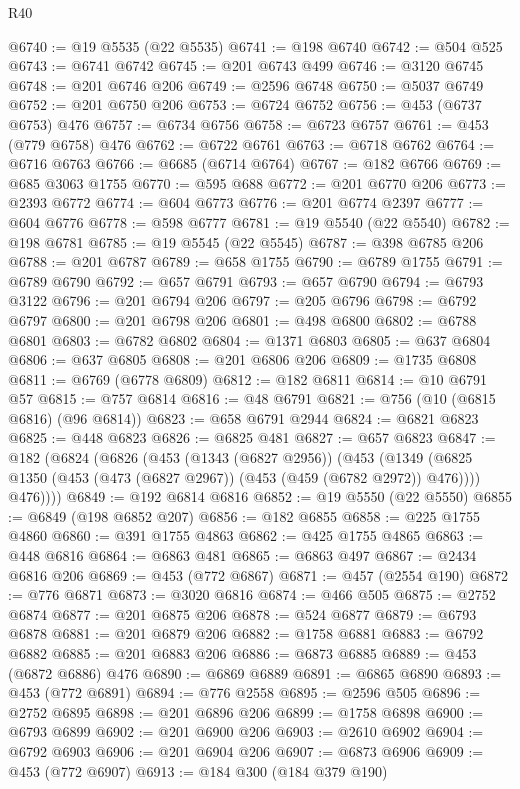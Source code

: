 \begin{lexlean}{R40}
\begin{coremodule}
@6740 := @19 @5535 (@22 @5535)
@6741 := @198 @6740
@6742 := @504 @525
@6743 := @6741 @6742
@6745 := @201 @6743 @499
@6746 := @3120 @6745
@6748 := @201 @6746 @206
@6749 := @2596 @6748
@6750 := @5037 @6749
@6752 := @201 @6750 @206
@6753 := @6724 @6752
@6756 := @453 (@6737 @6753) @476
@6757 := @6734 @6756
@6758 := @6723 @6757
@6761 := @453 (@779 @6758) @476
@6762 := @6722 @6761
@6763 := @6718 @6762
@6764 := @6716 @6763
@6766 := @6685 (@6714 @6764)
@6767 := @182 @6766
@6769 := @685 @3063 @1755
@6770 := @595 @688
@6772 := @201 @6770 @206
@6773 := @2393 @6772
@6774 := @604 @6773
@6776 := @201 @6774 @2397
@6777 := @604 @6776
@6778 := @598 @6777
@6781 := @19 @5540 (@22 @5540)
@6782 := @198 @6781
@6785 := @19 @5545 (@22 @5545)
@6787 := @398 @6785 @206
@6788 := @201 @6787
@6789 := @658 @1755
@6790 := @6789 @1755
@6791 := @6789 @6790
@6792 := @657 @6791
@6793 := @657 @6790
@6794 := @6793 @3122
@6796 := @201 @6794 @206
@6797 := @205 @6796
@6798 := @6792 @6797
@6800 := @201 @6798 @206
@6801 := @498 @6800
@6802 := @6788 @6801
@6803 := @6782 @6802
@6804 := @1371 @6803
@6805 := @637 @6804
@6806 := @637 @6805
@6808 := @201 @6806 @206
@6809 := @1735 @6808
@6811 := @6769 (@6778 @6809)
@6812 := @182 @6811
@6814 := @10 @6791 @57
@6815 := @757 @6814
@6816 := @48 @6791
@6821 := @756 (@10 (@6815 @6816) (@96 @6814))
@6823 := @658 @6791 @2944
@6824 := @6821 @6823
@6825 := @448 @6823
@6826 := @6825 @481
@6827 := @657 @6823
@6847 := @182
    (@6824
      (@6826
        (@453
          (@1343 (@6827 @2956))
          (@453
            (@1349 (@6825 @1350 (@453 (@473 (@6827 @2967)) (@453 (@459 (@6782 @2972)) @476))))
            @476))))
@6849 := @192 @6814 @6816
@6852 := @19 @5550 (@22 @5550)
@6855 := @6849 (@198 @6852 @207)
@6856 := @182 @6855
@6858 := @225 @1755 @4860
@6860 := @391 @1755 @4863
@6862 := @425 @1755 @4865
@6863 := @448 @6816
@6864 := @6863 @481
@6865 := @6863 @497
@6867 := @2434 @6816 @206
@6869 := @453 (@772 @6867)
@6871 := @457 (@2554 @190)
@6872 := @776 @6871
@6873 := @3020 @6816
@6874 := @466 @505
@6875 := @2752 @6874
@6877 := @201 @6875 @206
@6878 := @524 @6877
@6879 := @6793 @6878
@6881 := @201 @6879 @206
@6882 := @1758 @6881
@6883 := @6792 @6882
@6885 := @201 @6883 @206
@6886 := @6873 @6885
@6889 := @453 (@6872 @6886) @476
@6890 := @6869 @6889
@6891 := @6865 @6890
@6893 := @453 (@772 @6891)
@6894 := @776 @2558
@6895 := @2596 @505
@6896 := @2752 @6895
@6898 := @201 @6896 @206
@6899 := @1758 @6898
@6900 := @6793 @6899
@6902 := @201 @6900 @206
@6903 := @2610 @6902
@6904 := @6792 @6903
@6906 := @201 @6904 @206
@6907 := @6873 @6906
@6909 := @453 (@772 @6907)
@6913 := @184 @300 (@184 @379 @190)

\end{coremodule}
\end{lexlean}
